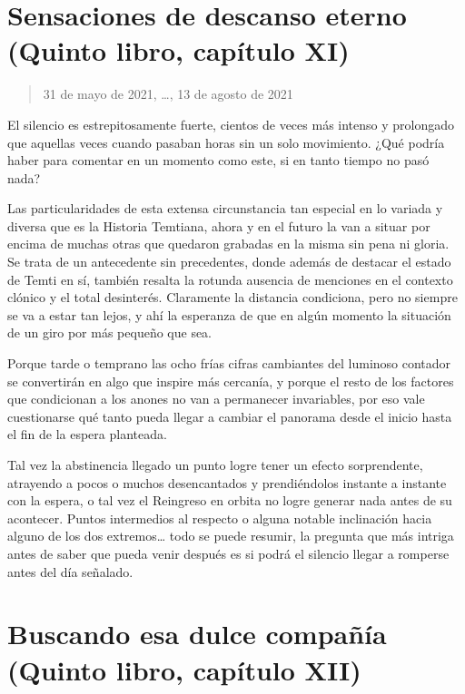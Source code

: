 \documentclass[
  spanish,
]{book}
\begin{document}
\hypertarget{sensaciones-de-descanso-eterno-quinto-libro-capuxedtulo-xi}{%
\section{Sensaciones de descanso eterno (Quinto libro, capítulo XI)}\label{sensaciones-de-descanso-eterno-quinto-libro-capuxedtulo-xi}}

\begin{quote}
31 de mayo de 2021, \ldots, 13 de agosto de 2021
\end{quote}

El silencio es estrepitosamente fuerte, cientos de veces más intenso y prolongado que aquellas veces cuando pasaban horas sin un solo movimiento. ¿Qué podría haber para comentar en un momento como este, si en tanto tiempo no pasó nada?

Las particularidades de esta extensa circunstancia tan especial en lo variada y diversa que es la Historia Temtiana, ahora y en el futuro la van a situar por encima de muchas otras que quedaron grabadas en la misma sin pena ni gloria. Se trata de un antecedente sin precedentes, donde además de destacar el estado de Temti en sí, también resalta la rotunda ausencia de menciones en el contexto clónico y el total desinterés. Claramente la distancia condiciona, pero no siempre se va a estar tan lejos, y ahí la esperanza de que en algún momento la situación de un giro por más pequeño que sea.

Porque tarde o temprano las ocho frías cifras cambiantes del luminoso contador se convertirán en algo que inspire más cercanía, y porque el resto de los factores que condicionan a los anones no van a permanecer invariables, por eso vale cuestionarse qué tanto pueda llegar a cambiar el panorama desde el inicio hasta el fin de la espera planteada.

Tal vez la abstinencia llegado un punto logre tener un efecto sorprendente, atrayendo a pocos o muchos desencantados y prendiéndolos instante a instante con la espera, o tal vez el Reingreso en orbita no logre generar nada antes de su acontecer. Puntos intermedios al respecto o alguna notable inclinación hacia alguno de los dos extremos\ldots{} todo se puede resumir, la pregunta que más intriga antes de saber que pueda venir después es si podrá el silencio llegar a romperse antes del día señalado.

\hypertarget{buscando-esa-dulce-compauxf1uxeda-quinto-libro-capuxedtulo-xii}{%
\section{Buscando esa dulce compañía (Quinto libro, capítulo XII)}\label{buscando-esa-dulce-compauxf1uxeda-quinto-libro-capuxedtulo-xii}}
\end{document}
